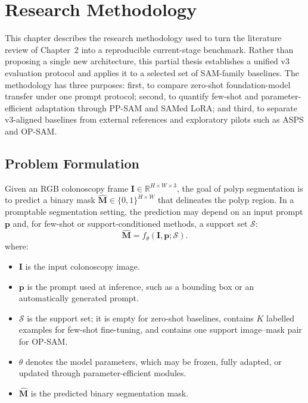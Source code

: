 
\chapter{Research Methodology}
\label{chap:methodology}
\label{chap:outline}

This chapter describes the research methodology used to turn the literature review of Chapter~2 into a reproducible current-stage benchmark. Rather than proposing a single new architecture, this partial thesis establishes a unified v3 evaluation protocol and applies it to a selected set of SAM-family baselines. The methodology has three purposes: first, to compare zero-shot foundation-model transfer under one prompt protocol; second, to quantify few-shot and parameter-efficient adaptation through PP-SAM and SAMed LoRA; and third, to separate v3-aligned baselines from external references and exploratory pilots such as ASPS and OP-SAM.

\section{Problem Formulation}
\label{sec:problem-formulation}

Given an RGB colonoscopy frame $\mathbf{I}\in\mathbb{R}^{H\times W\times 3}$, the goal of polyp segmentation is to predict a binary mask $\hat{\mathbf{M}}\in\{0,1\}^{H\times W}$ that delineates the polyp region. In a promptable segmentation setting, the prediction may depend on an input prompt $\mathbf{p}$ and, for few-shot or support-conditioned methods, a support set $\mathcal{S}$:
\begin{equation}
  \hat{\mathbf{M}} = f_{\theta}(\mathbf{I}, \mathbf{p}; \mathcal{S}).
  \label{eq:task-formulation}
\end{equation}
\noindent where:
\begin{itemize}
  \setlength{\itemsep}{0pt}
  \item $\mathbf{I}$ is the input colonoscopy image.
  \item $\mathbf{p}$ is the prompt used at inference, such as a bounding box or an automatically generated prompt.
  \item $\mathcal{S}$ is the support set; it is empty for zero-shot baselines, contains $K$ labelled examples for few-shot fine-tuning, and contains one support image--mask pair for OP-SAM.
  \item $\theta$ denotes the model parameters, which may be frozen, fully adapted, or updated through parameter-efficient modules.
  \item $\hat{\mathbf{M}}$ is the predicted binary segmentation mask.
\end{itemize}

